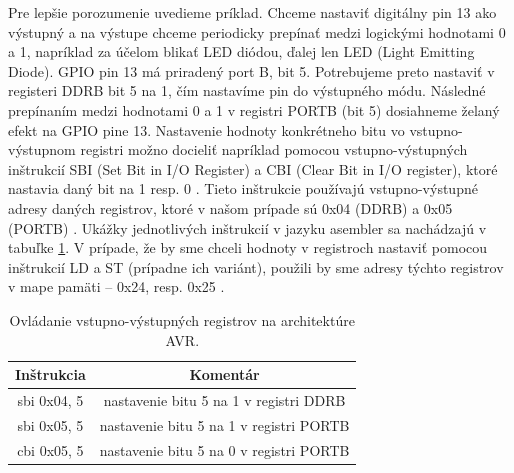 Pre lepšie porozumenie uvedieme príklad. Chceme nastaviť digitálny pin 13 ako výstupný a na výstupe chceme periodicky prepínať medzi logickými hodnotami 0 a 1, napríklad za účelom blikať LED diódou, ďalej len LED (Light Emitting Diode). GPIO pin 13 má priradený port B, bit 5. Potrebujeme preto nastaviť v registeri DDRB bit 5 na 1, čím nastavíme pin do výstupného módu. Následné prepínaním medzi hodnotami 0 a 1 v registri PORTB (bit 5) dosiahneme želaný efekt na GPIO pine 13. Nastavenie hodnoty konkrétneho bitu vo vstupno-výstupnom registri možno docieliť napríklad pomocou vstupno-výstupných inštrukcií SBI (Set Bit in I/O Register) a CBI (Clear Bit in I/O register), ktoré nastavia daný bit na 1 resp. 0 \cite{avrInstruction}. Tieto inštrukcie používajú vstupno-výstupné adresy daných registrov, ktoré v našom prípade sú 0x04 (DDRB) a 0x05 (PORTB) \cite{atmegaData}. Ukážky jednotlivých inštrukcií v jazyku asembler sa nachádzajú v tabuľke \ref{tab:ovladanieVV}. V prípade, že by sme chceli hodnoty v registroch nastaviť pomocou inštrukcií LD a ST (prípadne ich variánt), použili by sme adresy týchto registrov v mape pamäti -- 0x24, resp. 0x25 \cite{atmegaData}.

\begin{table}
    \caption[Ovládanie vstupno-výstupných registrov na architektúre AVR]{Ovládanie vstupno-výstupných registrov na architektúre AVR.}
    \label{tab:ovladanieVV}
    \begin{center}
    \begin{tabular}{|c|c|}
        \hline 
        Inštrukcia & Komentár \\
        \hline
        sbi 0x04, 5 & nastavenie bitu 5 na 1 v registri DDRB \\
        \hline
        sbi 0x05, 5 & nastavenie bitu 5 na 1 v registri PORTB \\
        \hline
        cbi 0x05, 5 & nastavenie bitu 5 na 0 v registri PORTB \\
        \hline
    \end{tabular}
    \end{center}
\end{table}

